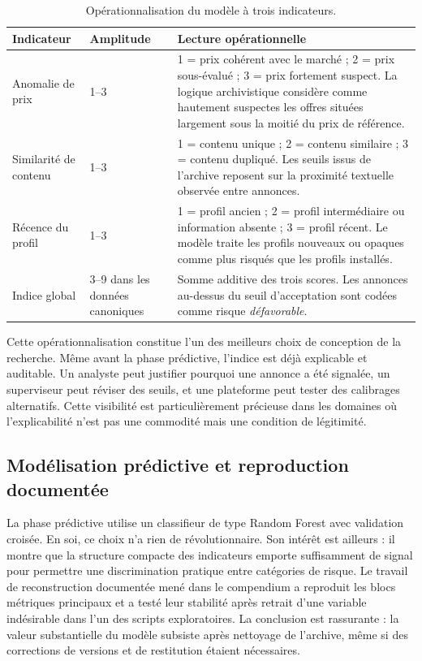 \documentclass[10pt,a4paper]{article}
\begin{document}
\begin{table}[H]
\centering
\caption{Opérationnalisation du modèle à trois indicateurs.}
\begin{tabularx}{\textwidth}{p{3.3cm} p{1.5cm} Y}
\toprule
\textbf{Indicateur} & \textbf{Amplitude} & \textbf{Lecture opérationnelle} \\
\midrule
Anomalie de prix & 1--3 & 1 = prix cohérent avec le marché ; 2 = prix sous-évalué ; 3 = prix fortement suspect. La logique archivistique considère comme hautement suspectes les offres situées largement sous la moitié du prix de référence. \\
Similarité de contenu & 1--3 & 1 = contenu unique ; 2 = contenu similaire ; 3 = contenu dupliqué. Les seuils issus de l'archive reposent sur la proximité textuelle observée entre annonces. \\
Récence du profil & 1--3 & 1 = profil ancien ; 2 = profil intermédiaire ou information absente ; 3 = profil récent. Le modèle traite les profils nouveaux ou opaques comme plus risqués que les profils installés. \\
Indice global & 3--9 dans les données canoniques & Somme additive des trois scores. Les annonces au-dessus du seuil d'acceptation sont codées comme risque \emph{défavorable}. \\
\bottomrule
\end{tabularx}
\end{table}

Cette opérationnalisation constitue l'un des meilleurs choix de conception de la recherche. Même avant la phase prédictive, l'indice est déjà explicable et auditable. Un analyste peut justifier pourquoi une annonce a été signalée, un superviseur peut réviser des seuils, et une plateforme peut tester des calibrages alternatifs. Cette visibilité est particulièrement précieuse dans les domaines où l'explicabilité n'est pas une commodité mais une condition de légitimité.

\subsection{Modélisation prédictive et reproduction documentée}
La phase prédictive utilise un classifieur de type Random Forest avec validation croisée. En soi, ce choix n'a rien de révolutionnaire. Son intérêt est ailleurs : il montre que la structure compacte des indicateurs emporte suffisamment de signal pour permettre une discrimination pratique entre catégories de risque. Le travail de reconstruction documentée mené dans le compendium a reproduit les blocs métriques principaux et a testé leur stabilité après retrait d'une variable indésirable dans l'un des scripts exploratoires. La conclusion est rassurante : la valeur substantielle du modèle subsiste après nettoyage de l'archive, même si des corrections de versions et de restitution étaient nécessaires.
\end{document}
